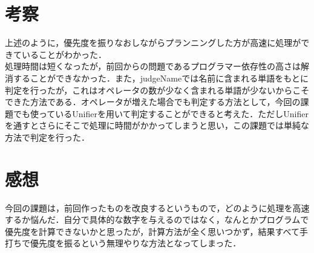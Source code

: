 \documentclass[a4j]{jarticle}
\begin{document}
\section{考察}
上述のように，優先度を振りなおしながらプランニングした方が高速に処理ができていることがわかった．\\
処理時間は短くなったが，前回からの問題であるプログラマー依存性の高さは解消することができなかった．また，judgeNameでは名前に含まれる単語をもとに判定を行ったが，これはオペレータの数が少なく含まれる単語が少ないからこそできた方法である．オペレータが増えた場合でも判定する方法として，今回の課題でも使っているUnifierを用いて判定することができると考えた．ただしUnifierを通すとさらにそこで処理に時間がかかってしまうと思い，この課題では単純な方法で判定を行った．
\section{感想}
今回の課題は，前回作ったものを改良するというもので，どのように処理を高速するか悩んだ．自分で具体的な数字を与えるのではなく，なんとかプログラムで優先度を計算できないかと思ったが，計算方法が全く思いつかず，結果すべて手打ちで優先度を振るという無理やりな方法となってしまった．
\end{document}
